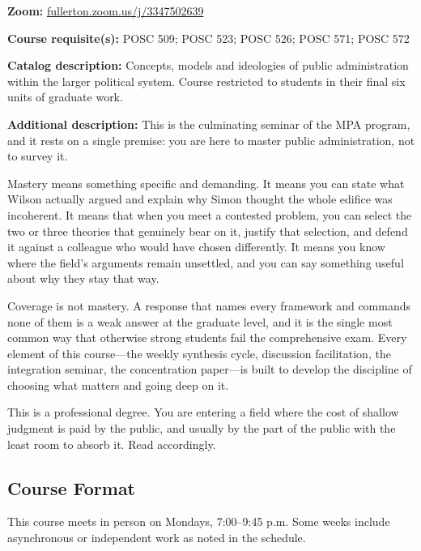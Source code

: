 \documentclass[11pt]{article}     %
\begin{document}
\vspace{0.5em}
\begin{flatlist}
\item \textbf{Zoom:} \href{https://fullerton.zoom.us/j/3347502639}{fullerton.zoom.us/j/3347502639}
\item \textbf{Course requisite(s):} POSC 509; POSC 523; POSC 526; POSC 571; POSC 572
\item \textbf{Catalog description:} Concepts, models and ideologies of public administration within the larger political system. Course restricted to students in their final six units of graduate work.
\item \textbf{Additional description:} This is the culminating seminar of the MPA program, and it rests on a single premise: you are here to master public administration, not to survey it.

    \vspace{0.5em}
    Mastery means something specific and demanding. It means you can state what Wilson actually argued and explain why Simon thought the whole edifice was incoherent. It means that when you meet a contested problem, you can select the two or three theories that genuinely bear on it, justify that selection, and defend it against a colleague who would have chosen differently. It means you know where the field's arguments remain unsettled, and you can say something useful about why they stay that way.

    \vspace{0.5em}
    Coverage is not mastery. A response that names every framework and commands none of them is a weak answer at the graduate level, and it is the single most common way that otherwise strong students fail the comprehensive exam. Every element of this course---the weekly synthesis cycle, discussion facilitation, the integration seminar, the concentration paper---is built to develop the discipline of choosing what matters and going deep on it.

    \vspace{0.5em}
    This is a professional degree. You are entering a field where the cost of shallow judgment is paid by the public, and usually by the part of the public with the least room to absorb it. Read accordingly.
\end{flatlist}

\subsection*{Course Format}
This course meets in person on Mondays, 7:00--9:45 p.m. Some weeks include asynchronous or independent work as noted in the schedule.
\end{document}
